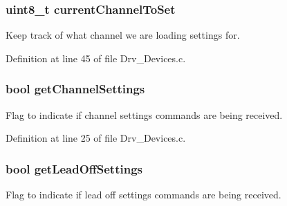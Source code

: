 \subsubsection[{\texorpdfstring{current\+Channel\+To\+Set}{currentChannelToSet}}]{\setlength{\rightskip}{0pt plus 5cm}uint8\+\_\+t current\+Channel\+To\+Set}\hypertarget{group__Devices__Library_ga15bd8e07189205b21eb37b666895ee0e}{}\label{group__Devices__Library_ga15bd8e07189205b21eb37b666895ee0e}


Keep track of what channel we are loading settings for. 



Definition at line 45 of file Drv\+\_\+\+Devices.\+c.

\subsubsection[{\texorpdfstring{get\+Channel\+Settings}{getChannelSettings}}]{\setlength{\rightskip}{0pt plus 5cm}bool get\+Channel\+Settings}\hypertarget{group__Devices__Library_ga7ef266ee79910e6754e8783b550b4a0a}{}\label{group__Devices__Library_ga7ef266ee79910e6754e8783b550b4a0a}


Flag to indicate if channel settings commands are being received. 



Definition at line 25 of file Drv\+\_\+\+Devices.\+c.

\subsubsection[{\texorpdfstring{get\+Lead\+Off\+Settings}{getLeadOffSettings}}]{\setlength{\rightskip}{0pt plus 5cm}bool get\+Lead\+Off\+Settings}\hypertarget{group__Devices__Library_ga774931d6c0caa199a9884bce2b300439}{}\label{group__Devices__Library_ga774931d6c0caa199a9884bce2b300439}


Flag to indicate if lead off settings commands are being received. 



